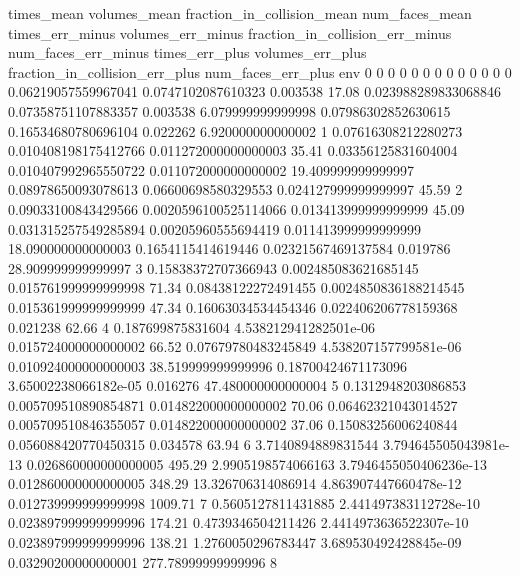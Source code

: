 times_mean	volumes_mean	fraction_in_collision_mean	num_faces_mean	times_err_minus	volumes_err_minus	fraction_in_collision_err_minus	num_faces_err_minus	times_err_plus	volumes_err_plus	fraction_in_collision_err_plus	num_faces_err_plus	env
0	0	0	0	0	0	0	0	0	0	0	0	0
0.06219057559967041	0.0747102087610323	0.003538	17.08	0.023988289833068846	0.07358751107883357	0.003538	6.079999999999998	0.07986302852630615	0.16534680780696104	0.022262	6.920000000000002	1
0.07616308212280273	0.010408198175412766	0.011272000000000003	35.41	0.03356125831604004	0.010407992965550722	0.011072000000000002	19.409999999999997	0.08978650093078613	0.06600698580329553	0.024127999999999997	45.59	2
0.09033100843429566	0.0020596100525114066	0.013413999999999999	45.09	0.031315257549285894	0.00205960555694419	0.011413999999999999	18.090000000000003	0.1654115414619446	0.02321567469137584	0.019786	28.909999999999997	3
0.15838372707366943	0.002485083621685145	0.015761999999999998	71.34	0.08438122272491455	0.0024850836188214545	0.015361999999999999	47.34	0.16063034534454346	0.022406206778159368	0.021238	62.66	4
0.187699875831604	4.538212941282501e-06	0.015724000000000002	66.52	0.07679780483245849	4.538207157799581e-06	0.010924000000000003	38.519999999999996	0.18700424671173096	3.65002238066182e-05	0.016276	47.480000000000004	5
0.1312948203086853	0.005709510890854871	0.014822000000000002	70.06	0.06462321043014527	0.005709510846355057	0.014822000000000002	37.06	0.15083256006240844	0.056088420770450315	0.034578	63.94	6
3.7140894889831544	3.794645505043981e-13	0.026860000000000005	495.29	2.9905198574066163	3.7946455050406236e-13	0.012860000000000005	348.29	13.326706314086914	4.863907447660478e-12	0.012739999999999998	1009.71	7
0.5605127811431885	2.441497383112728e-10	0.023897999999999996	174.21	0.4739346504211426	2.4414973636522307e-10	0.023897999999999996	138.21	1.2760050296783447	3.689530492428845e-09	0.03290200000000001	277.78999999999996	8
